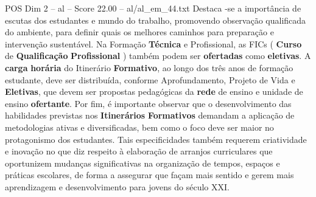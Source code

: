 \begin{textsample}{POS Dim 2 – al – Score 22.00 – al/al\_em\_44.txt}
Destaca -se a importância de escutas dos estudantes e mundo do trabalho, promovendo observação qualificada do ambiente, para definir quais os melhores caminhos para preparação e intervenção sustentável.
Na Formação \textbf{Técnica} e Profissional, as FICs ( \textbf{Curso} de \textbf{Qualificação} \textbf{Profissional} ) também podem ser \textbf{ofertadas} como \textbf{eletivas}.
A \textbf{carga} \textbf{horária} do Itinerário \textbf{Formativo}, ao longo dos três anos de formação estudante, deve ser distribuída, conforme Aprofundamento, Projeto de Vida e \textbf{Eletivas}, que devem ser propostas pedagógicas da \textbf{rede} de ensino e unidade de ensino \textbf{ofertante}.
Por fim, é importante observar que o desenvolvimento das habilidades previstas nos \textbf{Itinerários} \textbf{Formativos} demandam a aplicação de metodologias ativas e diversificadas, bem como o foco deve ser maior no protagonismo dos estudantes.
Tais especificidades também requerem criatividade e inovação no que diz respeito à elaboração de arranjos curriculares que oportunizem mudanças significativas na organização de tempos, espaços e práticas escolares, de forma a assegurar que façam mais sentido e gerem mais aprendizagem e desenvolvimento para jovens do século XXI.

\end{textsample}
